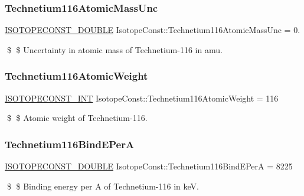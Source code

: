\subsubsection{\texorpdfstring{Technetium116\+Atomic\+Mass\+Unc}{Technetium116AtomicMassUnc}}
{\footnotesize\ttfamily \mbox{\hyperlink{group___isotope_const-_macros_ga8f45a7272ce02c0b4c65c44636ed719a}{I\+S\+O\+T\+O\+P\+E\+C\+O\+N\+S\+T\+\_\+\+D\+O\+U\+B\+LE}} Isotope\+Const\+::\+Technetium116\+Atomic\+Mass\+Unc = 0.}

\$ \$ Uncertainty in atomic mass of Technetium-\/116 in amu. \mbox{\label{group___isotope_const-_technetium-_tc116_gab299606dbb85ef7dcdd0034ecc2432c4}} 
\subsubsection{\texorpdfstring{Technetium116\+Atomic\+Weight}{Technetium116AtomicWeight}}
{\footnotesize\ttfamily \mbox{\hyperlink{group___isotope_const-_macros_ga5f18360b3e99483a35c32d789e62621c}{I\+S\+O\+T\+O\+P\+E\+C\+O\+N\+S\+T\+\_\+\+I\+NT}} Isotope\+Const\+::\+Technetium116\+Atomic\+Weight = 116}

\$ \$ Atomic weight of Technetium-\/116. \mbox{\label{group___isotope_const-_technetium-_tc116_gad8748cf647730dc9e5c4ca5db1c11e0f}} 
\subsubsection{\texorpdfstring{Technetium116\+Bind\+E\+PerA}{Technetium116BindEPerA}}
{\footnotesize\ttfamily \mbox{\hyperlink{group___isotope_const-_macros_ga8f45a7272ce02c0b4c65c44636ed719a}{I\+S\+O\+T\+O\+P\+E\+C\+O\+N\+S\+T\+\_\+\+D\+O\+U\+B\+LE}} Isotope\+Const\+::\+Technetium116\+Bind\+E\+PerA = 8225}

\$ \$ Binding energy per A of Technetium-\/116 in keV. \mbox{\label{group___isotope_const-_technetium-_tc116_gafeeb2548cef4c8517c80b63dad467e97}} 
